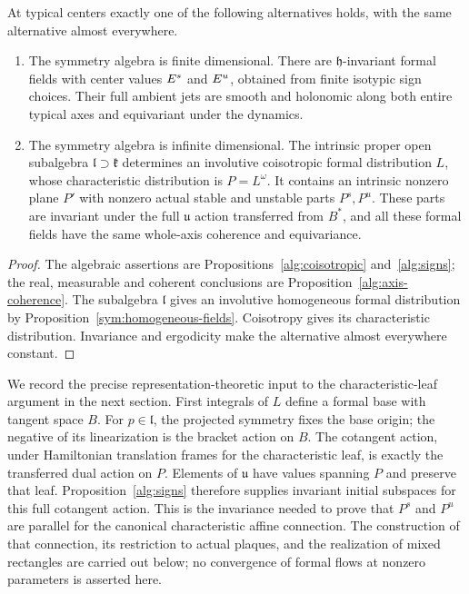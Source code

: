 \begin{theorem}
\label{alg:dichotomy}
At typical centers exactly one of the following alternatives holds,
with the same alternative almost everywhere.
\begin{enumerate}[label=(\roman*)]
\item The symmetry algebra is finite dimensional. There are
$\mathfrak h$-invariant formal fields with center values $E^s$
and $E^u$, obtained from finite isotypic sign choices. Their full
ambient jets are smooth and holonomic along both entire typical
axes and equivariant under the dynamics.
\item The symmetry algebra is infinite dimensional. The intrinsic
proper open subalgebra $\mathfrak l\supset\mathfrak k$ determines
an involutive coisotropic formal distribution $L$, whose
characteristic distribution is $P=L^\omega$. It contains an
intrinsic nonzero plane $P'$ with nonzero actual stable and unstable
parts $P^s,P^u$. These parts are invariant under the full
$\mathfrak u$ action transferred from $B^*$, and all these formal
fields have the same whole-axis coherence and equivariance.
\end{enumerate}
\end{theorem}

\begin{proof}
The algebraic assertions are
Propositions~\ref{alg:coisotropic} and~\ref{alg:signs}; the real,
measurable and coherent conclusions are
Proposition~\ref{alg:axis-coherence}. The subalgebra
$\mathfrak l$ gives an involutive homogeneous formal distribution
by Proposition~\ref{sym:homogeneous-fields}. Coisotropy gives its
characteristic distribution. Invariance and ergodicity make the
alternative almost everywhere constant.
\end{proof}

We record the precise representation-theoretic input to the
characteristic-leaf argument in the next section. First integrals
of $L$ define a formal base with tangent space $B$. For
$p\in\mathfrak l$, the projected symmetry fixes the base origin;
the negative of its linearization is the bracket action on $B$.
The cotangent action, under Hamiltonian translation frames for the
characteristic leaf, is exactly the transferred dual action on $P$.
Elements of $\mathfrak u$ have values spanning $P$ and preserve
that leaf. Proposition~\ref{alg:signs} therefore supplies invariant
initial subspaces for this full cotangent action. This is the
invariance needed to prove that $P^s$ and $P^u$ are parallel for
the canonical characteristic affine connection. The construction
of that connection, its restriction to actual plaques, and the
realization of mixed rectangles are carried out below; no
convergence of formal flows at nonzero parameters is asserted here.
